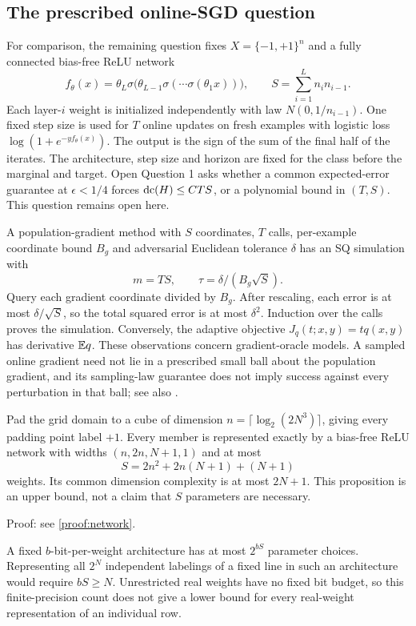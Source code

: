\subsection{The prescribed online-SGD question}
For comparison, the remaining question fixes $X=\{-1,+1\}^n$ and a fully connected bias-free ReLU network
\[
 f_\theta(x)=\theta_L\sigma\bigl(\theta_{L-1}\sigma(\cdots\sigma(\theta_1x))\bigr),
 \qquad S=\sum_{i=1}^L n_i n_{i-1}.
\]
Each layer-$i$ weight is initialized independently with law $N(0,1/n_{i-1})$. One fixed step size is used for $T$ online updates on fresh examples with logistic loss $\log(1+e^{-yf_\theta(x)})$. The output is the sign of the sum of the final half of the iterates. The architecture, step size and horizon are fixed for the class before the marginal and target. Open Question 1 asks whether a common expected-error guarantee at $\epsilon<1/4$ forces $\operatorname{dc}(H)\le CTS$, or a polynomial bound in $(T,S)$. This question remains open here.

A population-gradient method with $S$ coordinates, $T$ calls, per-example coordinate bound $B_g$ and adversarial Euclidean tolerance $\delta$ has an SQ simulation with
\[
 m=TS,\qquad\tau=\delta/(B_g\sqrt S).
\]
Query each gradient coordinate divided by $B_g$. After rescaling, each error is at most $\delta/\sqrt S$, so the total squared error is at most $\delta^2$. Induction over the calls proves the simulation. Conversely, the adaptive objective $J_q(t;x,y)=tq(x,y)$ has derivative $\mathbb E q$. These observations concern gradient-oracle models. A sampled online gradient need not lie in a prescribed small ball about the population gradient, and its sampling-law guarantee does not imply success against every perturbation in that ball; see also \citet{FGV21,AKMSS21}.

\begin{proposition}\label{thm:network}
Pad the grid domain to a cube of dimension $n=\lceil\log_2(2N^3)\rceil$, giving every padding point label $+1$. Every member is represented exactly by a bias-free ReLU network with widths $(n,2n,N+1,1)$ and at most
\[
 S=2n^2+2n(N+1)+(N+1)
\]
weights. Its common dimension complexity is at most $2N+1$. This proposition is an upper bound, not a claim that $S$ parameters are necessary.
\end{proposition}

\noindent Proof: see \cref{proof:network}.\par

A fixed $b$-bit-per-weight architecture has at most $2^{bS}$ parameter choices. Representing all $2^N$ independent labelings of a fixed line in such an architecture would require $bS\ge N$. Unrestricted real weights have no fixed bit budget, so this finite-precision count does not give a lower bound for every real-weight representation of an individual row.

